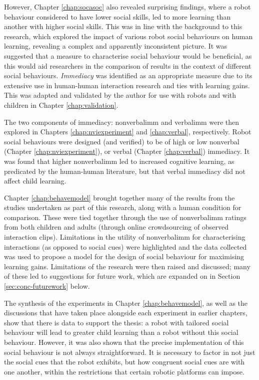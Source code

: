 However, Chapter \ref{chap:socasoc} also revealed surprising findings, where a robot behaviour considered to have lower social skills, led to more \gls{learning} than another with higher social skills. This was in line with the background to this research, which explored the impact of various robot social behaviours on human \gls{learning}, revealing a complex and apparently inconsistent picture. It was suggested that a measure to characterise social behaviour would be beneficial, as this would aid researchers in the comparison of results in the context of different social behaviours. \textit{Immediacy} was identified as an appropriate measure due to its extensive use in human-human interaction research and ties with \gls{learning} gains. This was adapted and validated by the author for use with robots and with children in Chapter \ref{chap:validation}.

The two components of immediacy: \gls{nonverbalimm} and \gls{verbalimm} were then explored in Chapters \ref{chap:nviexperiment} and \ref{chap:verbal}, respectively. Robot social behaviours were designed (and verified) to be of high or low nonverbal (Chapter \ref{chap:nviexperiment}), or verbal (Chapter \ref{chap:verbal}) immediacy. It was found that higher \gls{nonverbalimm} led to increased cognitive \gls{learning}, as predicated by the human-human literature, but that verbal immediacy did not affect child \gls{learning}.

Chapter \ref{chap:behavemodel} brought together many of the results from the studies undertaken as part of this research, along with a human condition for comparison. These were tied together through the use of \gls{nonverbalimm} ratings from both children and adults (through online crowdsourcing of observed interaction clips). Limitations in the utility of \gls{nonverbalimm} for characterising interactions (as opposed to social cues) were highlighted and the data collected was used to propose a model for the design of social behaviour for maximising \gls{learning} gains. Limitations of the research were then raised and discussed; many of these led to suggestions for future work, which are expanded on in Section \ref{sec:conc-futurework} below.

The synthesis of the experiments in Chapter \ref{chap:behavemodel}, as well as the discussions that have taken place alongside each experiment in earlier chapters, show that there is data to support the thesis: a robot with \gls{tailored} social behaviour will lead to greater child \gls{learning} than a robot without this social behaviour. However, it was also shown that the precise implementation of this social behaviour is not always straightforward. It is necessary to factor in not just the social cues that the robot exhibits, but how congruent social cues are with one another, within the restrictions that certain robotic platforms can impose.

